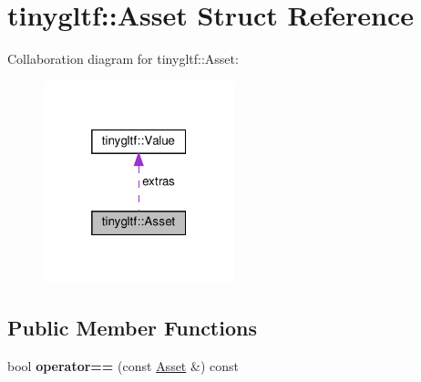 \hypertarget{structtinygltf_1_1Asset}{}\section{tinygltf\+:\+:Asset Struct Reference}
\label{structtinygltf_1_1Asset}


Collaboration diagram for tinygltf\+:\+:Asset\+:\nopagebreak
\begin{figure}[H]
\begin{center}
\leavevmode
\includegraphics[width=157pt]{structtinygltf_1_1Asset__coll__graph}
\end{center}
\end{figure}
\subsection*{Public Member Functions}
\begin{DoxyCompactItemize}
\item 
\mbox{\label{structtinygltf_1_1Asset_aa6cce1db3083fa43251e1931e4a7694e}} 
bool {\bfseries operator==} (const \hyperlink{structtinygltf_1_1Asset}{Asset} \&) const
\end{DoxyCompactItemize}
